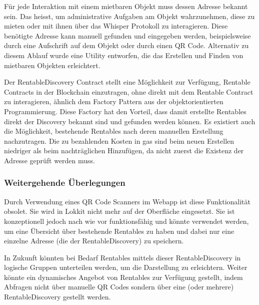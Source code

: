 Für jede Interaktion mit einem mietbaren Objekt muss dessen Adresse bekannt sein. Das heisst, um administrative Aufgaben am Objekt wahrzunehmen, diese zu mieten oder mit ihnen über das Whisper Protokoll zu interagieren. Diese benötigte Adresse kann manuell gefunden und eingegeben werden, beispielsweise durch eine Aufschrift auf dem Objekt oder durch einen QR Code. Alternativ zu diesem Ablauf wurde eine Utility entworfen, die das Erstellen und Finden von mietbaren Objekten erleichtert.

Der RentableDiscovery Contract stellt eine Möglichkeit zur Verfügung, Rentable Contracts in der Blockchain einzutragen, ohne direkt mit dem Rentable Contract zu interagieren, ähnlich dem Factory Pattern aus der objektorientierten Programmierung. Diese Factory hat den Vorteil, dass damit erstellte Rentables direkt der Discovery bekannt sind und gefunden werden können. Es existiert auch die Möglichkeit, bestehende Rentables nach deren manuellen Erstellung nachzutragen. Die zu bezahlenden Kosten in gas sind beim neuen Erstellen niedriger als beim nachträglichen Hinzufügen, da nicht zuerst die Existenz der Adresse geprüft werden muss.

\subsubsection{Weitergehende Überlegungen}
Durch Verwendung eines QR Code Scanners im Webapp ist diese Funktionalität obsolet. Sie wird in Lokkit nicht mehr auf der Oberfläche eingesetzt. Sie ist konzeptionell jedoch nach wie vor funktionsfähig und könnte verwendet werden, um eine Übersicht über bestehende Rentables zu haben und dabei nur eine einzelne Adresse (die der RentableDiscovery) zu speichern.

In Zukunft könnten bei Bedarf Rentables mittels dieser RentableDiscovery in logische Gruppen unterteilen werden, um die Darstellung zu erleichtern. Weiter könnte ein dynamisches Angebot von Rentables zur Verfügung gestellt, indem Abfragen nicht über manuelle QR Codes sondern über eine (oder mehrere) RentableDiscovery gestellt werden.
